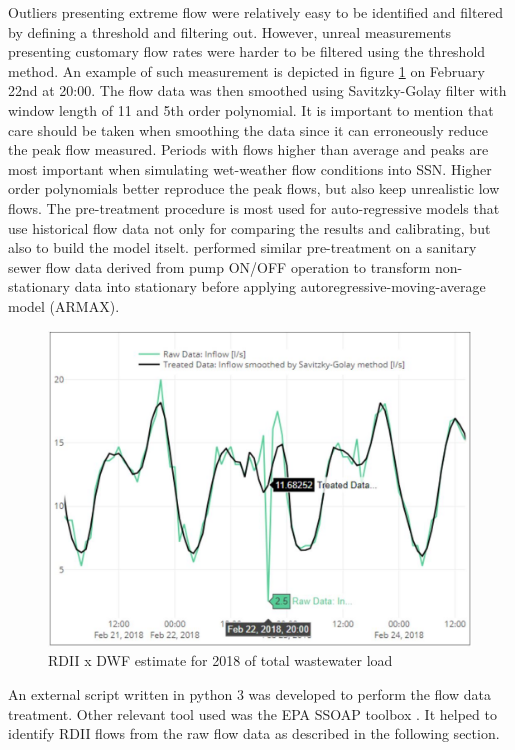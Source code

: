 Outliers presenting extreme flow were relatively easy to be identified and filtered by defining a threshold and filtering out. However, unreal measurements presenting customary flow rates were harder to be filtered using the threshold method. An example of such measurement is depicted in figure \ref{fig:smoothedflow} on February 22nd at 20:00. The flow data was then smoothed using Savitzky-Golay filter with window length of 11 and 5th order polynomial. It is important to mention that care should be taken when smoothing the data since it can erroneously reduce the peak flow measured. Periods with flows higher than average and peaks are most important when simulating wet-weather flow conditions into \ac{SSN}. Higher order polynomials better reproduce the peak flows, but also keep unrealistic low flows. The pre-treatment procedure is most used for auto-regressive models that use historical flow data not only for comparing the results and calibrating, but also to build the model itselt. \citet{Li2019} performed similar pre-treatment on a sanitary sewer flow data derived from pump ON/OFF operation to transform non-stationary data into stationary before applying autoregressive-moving-average model (ARMAX). 


\begin{figure}[ht]
    \centering
	\includegraphics[scale=0.45]{figures/rawinflow_x_processedinflow_smoothed.JPG}
	\caption{RDII x DWF estimate for 2018 of total wastewater load}
	\label{fig:smoothedflow}
\end{figure}

An external script written in python 3 was developed to perform the flow data treatment. Other relevant tool used was the EPA SSOAP toolbox \cite{Vallabhaneni2007}. It helped to identify RDII flows from the raw flow data as described in the following section.
    


